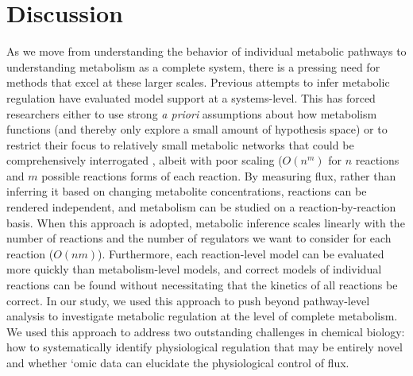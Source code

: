\section{Discussion}

As we move from understanding the behavior of individual metabolic pathways to understanding metabolism as a complete system, there is a pressing need for methods that excel at these larger scales. Previous attempts to infer metabolic regulation have evaluated model support at a systems-level.  This has forced researchers either to use strong \textit{a priori} assumptions about how metabolism functions (and thereby only explore a small amount of hypothesis space) \cite{Chassagnole:2002ty, Zampar:2013fr} or to restrict their focus to relatively small metabolic networks that could be comprehensively interrogated \cite{Link:2013dj}, albeit with poor scaling ($O(n^{m})$ for $n$ reactions and $m$ possible reactions forms of each reaction. By measuring flux, rather than inferring it based on changing metabolite concentrations, reactions can be rendered independent, and metabolism can be studied on a reaction-by-reaction basis. When this approach is adopted, metabolic inference scales linearly with the number of reactions and the number of regulators we want to consider for each reaction ($O(nm)$). Furthermore, each reaction-level model can be evaluated more quickly than metabolism-level models, and correct models of individual reactions can be found without necessitating that the kinetics of all reactions be correct. In our study, we used this approach to push beyond pathway-level analysis to investigate metabolic regulation at the level of complete metabolism. We used this approach to address two outstanding challenges in chemical biology: how to systematically identify physiological regulation that may be entirely novel and whether `omic data can elucidate the physiological control of flux.

